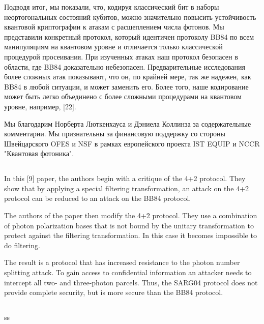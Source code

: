 Подводя итог, мы показали, что, кодируя классический бит в наборы неортогональных состояний кубитов, можно значительно повысить устойчивость квантовой криптографии к атакам с расщеплением числа фотонов. Мы представили конкретный протокол, который идентичен протоколу BB84 по всем манипуляциям на квантовом уровне и отличается только классической процедурой просеивания. При изученных атаках наш протокол безопасен в области, где BB84 доказательно небезопасен. Предварительные исследования более сложных атак показывают, что он, по крайней мере, так же надежен, как BB84 в любой ситуации, и может заменить его. Более того, наше кодирование может быть легко объединено с более сложными процедурами на квантовом уровне, например, [22].

Мы благодарим Норберта Люткенхауса и Дэниела Коллинза за содержательные комментарии. Мы признательны за финансовую поддержку со стороны Швейцарского OFES и NSF в рамках европейского проекта IST EQUIP и NCCR "Квантовая фотоника".
\subsection{\review}
In this [9] paper, the authors begin with a critique of the 4+2 protocol. They show that by applying a special filtering transformation, an attack on the 4+2 protocol can be reduced to an attack on the BB84 protocol.

The authors of the paper then modify the 4+2 protocol. They use a combination of photon polarization bases that is not bound by the unitary transformation to protect against the filtering transformation. In this case it becomes impossible to do filtering.

The result is a protocol that has increased resistance to the photon number splitting attack. To gain access to confidential information an attacker needs to intercept all two- and three-photon parcels. Thus, the SARG04 protocol does not provide complete security, but is more secure than the BB84 protocol.

\subsection{\dic}
ss